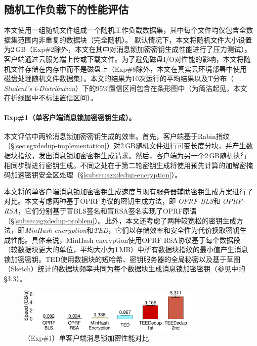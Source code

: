 \subsection{随机工作负载下的性能评估}
\label{subsec:sgxdedup-synthetic}

本文使用一组随机文件组成一个随机工作负载数据集，其中每个文件均仅包含全数据集范围内非重复的数据块（完全随机）。 默认情况下，本文将随机文件大小设置为2\,GB（Exp\#2除外，本文在其中对消息锁加密密钥生成性能进行了压力测试）。 客户端通过云服务端上传或下载文件。为了避免磁盘I/O对性能的影响，本文将随机文件存储在内存中而不是磁盘上（Exp\#8除外，本文在真实云环境部署中使用磁盘处理随机文件数据集）。本文的结果为10次运行的平均结果以及T分布（\textit{ Student's t-Distribution}）下的95\%置信区间包含在条形图中（为简洁起见，本文在折线图中不标注置信区间）。

\paragraph*{Exp\#1（单客户端消息锁加密密钥生成）。}本文评估\sysnameS 中两轮消息锁加密密钥生成的效率。首先，客户端基于Rabin指纹（\S\ref{sec:sgxdedup-implementation}）对2\,GB随机文件进行可变长度分块，并产生数据块指纹，发出消息锁加密密钥生成请求。然后，客户端为另一个2\,GB随机执行相同步骤进行密钥生成。不同之处在于第二轮密钥生成将使用预先计算的加解密掩码加速密钥安全区处理（\S\ref{subsec:sgxdedup-encryption}）。

本文将\sysnameS 的单客户端消息锁加密密钥生成速度与现有服务器辅助密钥生成方案进行了对比。本文考虑两种基于OPRF协议的密钥生成方法，即 \textit{OPRF-BLS}\cite{armknecht2015transparent}和\textit{ OPRF-RSA}\cite{bellare2013DupLESS}，它们分别基于盲BLS签名和盲RSA签名实现了OPRF原语（\S\ref{subsec:sgxdedup-problem}）。此外，本文还考虑了两种较宽松的密钥生成方法，即\textit{MinHash encryption}\cite{qin17}和\textit{TED}\cite{li2020TED}，它们以存储效率和安全性为代价换取密钥生成性能。具体来说，MinHash encryption使用OPRF-RSA协议基于每个数据段（较数据块更大的单位，平均大小为1\,MB）中所有数据块指纹的最小值产生消息锁加密密钥。TED使用数据块的短哈希、密钥服务器的全局秘密以及基于草图（Sketch）统计的数据块频率共同为每个数据块生成消息锁加密密钥（参见\cite{li2020TED}中的\S3.3）。

\begin{figure}[!htb]
    \centering
    \includegraphics[width=0.8\textwidth]{pic/sgxdedup/expa2_keyGenPerformance.pdf}
    \caption{（Exp\#1）单客户端消息锁加密性能对比}
    \label{fig:sgxdedup-keygen-comparison}
\end{figure}

